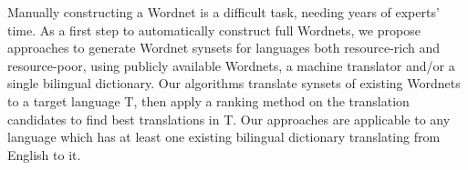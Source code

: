 Manually constructing a Wordnet is a difficult task, needing years of experts' time. As a first step to automatically construct full Wordnets, we propose approaches to generate Wordnet synsets for languages both resource-rich and resource-poor, using publicly available Wordnets, a machine translator and/or a single bilingual dictionary. Our algorithms translate synsets of existing Wordnets to a target language T, then apply a ranking method on the translation candidates to find best translations in T. Our approaches are applicable to any language which has at least one existing bilingual dictionary translating from English to it.
